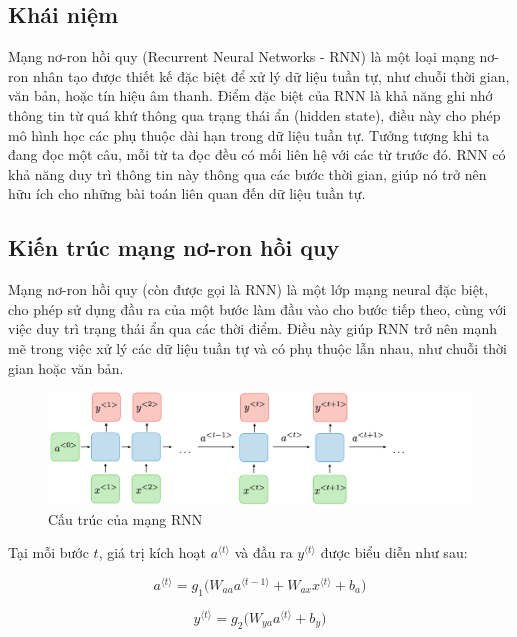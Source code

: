 \subsection{Khái niệm}
Mạng nơ-ron hồi quy (Recurrent Neural Networks - RNN) là một loại mạng nơ-ron nhân tạo được thiết kế đặc biệt để xử lý dữ liệu tuần tự, như chuỗi thời gian, văn bản, hoặc tín hiệu âm thanh. Điểm đặc biệt của RNN là khả năng ghi nhớ thông tin từ quá khứ thông qua trạng thái ẩn (hidden state), điều này cho phép mô hình học các phụ thuộc dài hạn trong dữ liệu tuần tự. Tưởng tượng khi ta đang đọc một câu, mỗi từ ta đọc đều có mối liên hệ với các từ trước đó. RNN có khả năng duy trì thông tin này thông qua các bước thời gian, giúp nó trở nên hữu ích cho những bài toán liên quan đến dữ liệu tuần tự.
\subsection{Kiến trúc mạng nơ-ron hồi quy}
Mạng nơ-ron hồi quy (còn được gọi là RNN) là một lớp mạng neural đặc biệt, cho phép sử dụng đầu ra của một bước làm đầu vào cho bước tiếp theo, cùng với việc duy trì trạng thái ẩn qua các thời điểm. Điều này giúp RNN trở nên mạnh mẽ trong việc xử lý các dữ liệu tuần tự và có phụ thuộc lẫn nhau, như chuỗi thời gian hoặc văn bản.

\begin{figure}[h]
    \centering
    \includegraphics[width=1\textwidth]{images/LSTM/architecture-rnn-ltr.png}
    \caption{Cấu trúc của mạng RNN}
    \label{fig:rnn_architecture}
\end{figure}

Tại mỗi bước $t$, giá trị kích hoạt $a^{\langle t \rangle}$ và đầu ra $y^{\langle t \rangle}$ được biểu diễn như sau:

\begin{equation}
    a^{\langle t \rangle} = g_1 \Big( W_{aa} a^{\langle t-1 \rangle} + W_{ax} x^{\langle t \rangle} + b_a \Big)
\end{equation}

\begin{equation}
    y^{\langle t \rangle} = g_2 \Big( W_{ya} a^{\langle t \rangle} + b_y \Big)
\end{equation}

